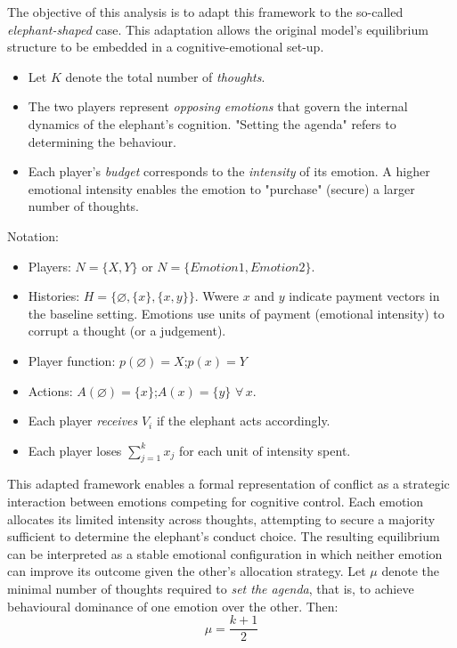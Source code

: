 \vspace*{1em}
The objective of this analysis is to adapt this framework to the so-called \textit{elephant-shaped} case.  
This adaptation allows the original model's equilibrium structure to be embedded in a cognitive-emotional set-up.


\begin{itemize}
    \item Let \( K \) denote the total number of \textit{thoughts}.
    \item The two players represent \textit{opposing emotions} that govern the internal dynamics of the elephant's cognition.  
    "Setting the agenda" refers to determining the behaviour.
    \item Each player's \textit{budget} corresponds to the \textit{intensity} of its emotion.  
    A higher emotional intensity enables the emotion to "purchase" (secure) a larger number of thoughts.
\end{itemize}

Notation:

\begin{itemize}
  \item[] Players: \(N=\{X,Y\}\) or \(N=\{Emotion 1, Emotion 2\}\).
  \item[] Histories: \(H= \big \{\varnothing,\{x\},\{x,y\}\big \}\). Wwere \(x\) and \(y\) indicate payment vectors in the baseline setting. Emotions use units of payment (emotional intensity) to corrupt a thought (or a judgement).
  \item[] Player function: \(p(\varnothing)=X\);\quad \(p(x)=Y\)
  \item[] Actions: \(A(\varnothing)=\{x\}\);\quad \(A(x)=\{y\}\) \(\forall\,x\).
  \item[] Each player \textit{receives} \(V_i\) if the elephant acts accordingly.
  \item[] Each player loses \(\sum_{j=1}^{k} x_{j}\) for each unit of intensity spent.
\end{itemize}

This adapted framework enables a formal representation of conflict as a strategic interaction between emotions competing for cognitive control. Each emotion allocates its limited intensity across thoughts, attempting to secure a majority sufficient to determine the elephant's conduct choice. The resulting equilibrium can be interpreted as a stable emotional configuration in which neither emotion can improve its outcome given the other's allocation strategy. Let \( \mu \) denote the minimal number of thoughts required to \textit{set the agenda}, that is, to achieve behavioural dominance of one emotion over the other. Then:
\[
\mu=\dfrac{k+1}{2}
\]



